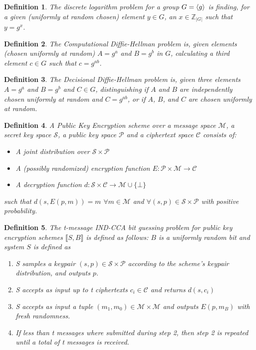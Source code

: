\documentclass[a4paper,german]{article}
\newtheorem{definition}{Definition}
\begin{document}
\begin{definition}
	The discrete logarithm problem for a group $G = \braket{g}$ is finding, for a given (uniformly at random chosen) element $y \in G$, an $x \in \mathbb{Z}_{|G|}$ such that $y = g^x$.
\end{definition}

\begin{definition}
	The Computational Diffie-Hellman problem is, given elements (chosen uniformly at random) $A = g^a$ and $B = g^b$ in $G$, calculating a third element $c \in G$ such that $c = g^{ab}$.
\end{definition}

\begin{definition}
	The Decisional Diffie-Hellman problem is, given three elements  $A = g^a$ and $B = g^b$ and $C \in G$, distinguishing if $A$ and $B$ are independently chosen uniformly at random and $C = g^{ab}$, or if $A$, $B$, and $C$ are chosen uniformly at random.
\end{definition}

\begin{definition}
	A Public Key Encryption scheme over a message space $\mathcal{M}$, a secret key space $\mathcal{S}$, a public key space $\mathcal{P}$ and a ciphertext space $\mathcal{C}$ consists of:
	
	\begin{itemize}
	
		\item  A joint distribution over $\mathcal{S \times P}$
		\item  A (possibly randomized) encryption function $E: \mathcal{P \times M} \rightarrow \mathcal{C}$
		\item  A decryption function $d: \mathcal{S \times C} \rightarrow \mathcal{M} \cup \{\bot\}$
	\end{itemize}
	such that $d(s, E(p, m)) = m$ $\forall m \in \mathcal{M}$ and $\forall (s, p) \in \mathcal{S \times P}$ with positive probability.
\end{definition}

\begin{definition}
	The t-message IND-CCA bit guessing problem for public key encryption schemes $\llbracket S, B\rrbracket$ is defined as follows: $B$ is a uniformly random bit and system $S$ is defined as

	\begin{enumerate}
	
		\item  S samples a keypair $(s, p) \in \mathcal{S \times P}$ according to the scheme's keypair distribution, and outputs $p$.
		\item  S accepts as input up to t ciphertexts $c_i \in \mathcal{C}$ and returns $d(s, c_i)$
		\item  S accepts as input a tuple $(m_1, m_0) \in \mathcal{M \times M}$ and outputs $E(p, m_B)$ with fresh randomness.
		\item  If less than t messages where submitted during step 2, then step 2 is repeated until a total of t messages is received.
	
	\end{enumerate}
\end{definition}
\end{document}
